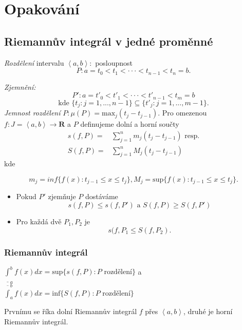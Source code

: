\documentclass[../main.tex]{subfiles}
\begin{document}
\section{Opakování}
\subsection{Riemannův integrál v jedné proměnné}
\hspace{1.2mm}
\textit{Rozdělení} intervalu $\left<a,b\right> : $ posloupnost 
\[P : a = t_0 < t_1 < \cdot \cdot \cdot < t_{n-1} < t_n = b.\]


{\normalsize
\textit{Zjemnění:
\[P' : a = t'_0 < t'_1 < \cdot \cdot \cdot < t'_{n-1} < t_m = b\]
\[\text{kde }\{t_j: j = 1,...,n-1\}\subseteq \{t'_j : j = 1,...,m-1\}.\]
}}
\textit{Jemnost rozdělení} $P: \mu(P) = \text{max}_j(t_j-t_{j-1}).$
\noindent
Pro omezenou $f:J=\left<a,b\right> \rightarrow \mathbf{R} $ a $P$ definujeme dolní a horní součty
\begin{align*}
    s(f,P) = & \sum^n_{j=1} m_j(t_j-t_{j-1}) \text{ resp.}\\
    S(f,P) = & \sum^n_{j=1} M_j(t_j-t_{j-1})
\end{align*}
kde

\[m_j = inf\{f(x) : t_{j-1} \leq x \leq t_j\}, M_j = \text{sup}\{f(x) : t_{j-1} \leq x \leq t_j\}.\]

\begin{itemize}
    \item Pokud $P'$ zjemňuje $P$ dostáváme
    \[s(f,P) \leq s(f,P') \text{ a } S(f,P) \geq S(f,P')\]
    \item Pro každá dvě $P_1, P_2$ je 
    \[s(f,P_1 \leq S(f, P_2).\]
\end{itemize}

\subsubsection{Riemannův integrál}
\hspace{1.2mm}
$\underline{\int}^b_{ a} f(x)dx = \text{sup}\{s(f,P) : P \text{ rozdělení}\}$ a
$\overline{\int}^b_{ a} f(x)dx = \text{inf}\{S(f,P) : P \text{ rozdělení}\}$ 

Prvnímu se říka dolní Riemannův integrál $f$ přes $\left<a,b\right>$, druhé je horní Riemannův integrál.
\end{document}
